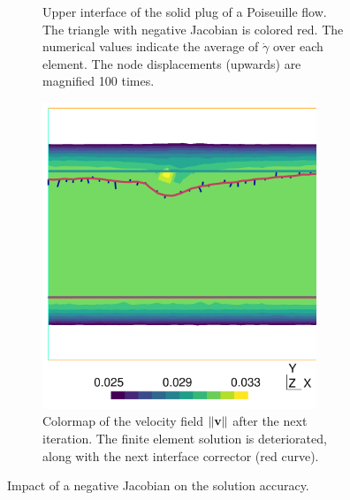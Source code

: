 \documentclass[11 pt]{report}
\begin{document}
\begin{figure}
    \centering
    \begin{subfigure}[t]{0.55\textwidth}
        \centering
        
        \caption{Upper interface of the solid plug of a Poiseuille flow. The triangle with negative Jacobian is colored red. The numerical values indicate the average of $\dot\gamma$ over each element. The node displacements (upwards) are magnified 100 times.}
    \end{subfigure}\vspace{6pt}
    \begin{subfigure}[t]{0.55\textwidth}
        \centering
        \includegraphics[width=0.90\textwidth]{../figures/negative_2.pdf}
        \caption{Colormap of the velocity field $\|\mathbf{v}\|$ after the next iteration. The finite element solution is deteriorated, along with the next interface corrector (red curve).}
    \end{subfigure}\vspace{6pt}
    \caption{Impact of a negative Jacobian on the solution accuracy.}
    \label{fig:failureNegative}
\end{figure}
\end{document}
